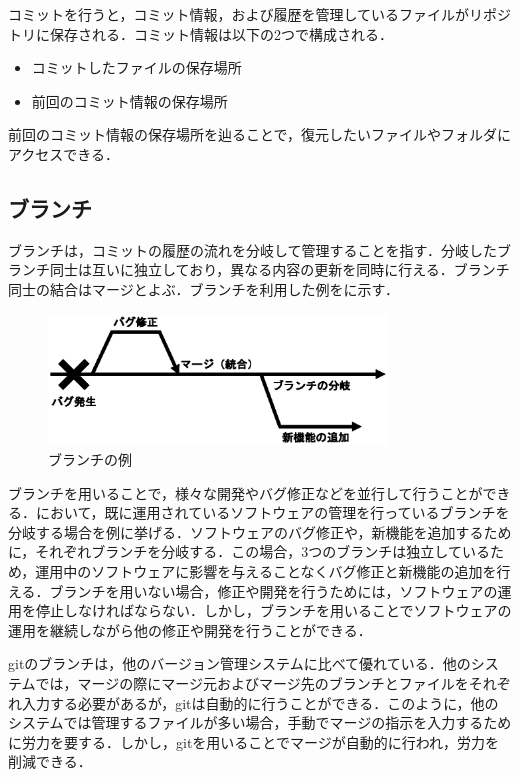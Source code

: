 \documentclass[a4j,9pt,twocolumn]{jsarticle}
\begin{document}
コミットを行うと，コミット情報，および履歴を管理しているファイルがリポジトリに保存される．コミット情報は以下の2つで構成される．

\begin{itemize}
\item コミットしたファイルの保存場所
\item 前回のコミット情報の保存場所
\end{itemize}

前回のコミット情報の保存場所を辿ることで，復元したいファイルやフォルダにアクセスできる．

\subsection{ブランチ}
ブランチは，コミットの履歴の流れを分岐して管理することを指す．分岐したブランチ同士は互いに独立しており，異なる内容の更新を同時に行える．ブランチ同士の結合はマージとよぶ．ブランチを利用した例をに示す．

\begin{figure}[h]
\centering
\includegraphics[width=90mm]{img/branch.eps}
\caption{ブランチの例}
\label{branch_ex}
\end{figure}

ブランチを用いることで，様々な開発やバグ修正などを並行して行うことができる．において，既に運用されているソフトウェアの管理を行っているブランチを分岐する場合を例に挙げる．ソフトウェアのバグ修正や，新機能を追加するために，それぞれブランチを分岐する．この場合，3つのブランチは独立しているため，運用中のソフトウェアに影響を与えることなくバグ修正と新機能の追加を行える．ブランチを用いない場合，修正や開発を行うためには，ソフトウェアの運用を停止しなければならない．しかし，ブランチを用いることでソフトウェアの運用を継続しながら他の修正や開発を行うことができる．

gitのブランチは，他のバージョン管理システムに比べて優れている．他のシステムでは，マージの際にマージ元およびマージ先のブランチとファイルをそれぞれ入力する必要があるが，gitは自動的に行うことができる．このように，他のシステムでは管理するファイルが多い場合，手動でマージの指示を入力するために労力を要する．しかし，gitを用いることでマージが自動的に行われ，労力を削減できる．
\end{document}
